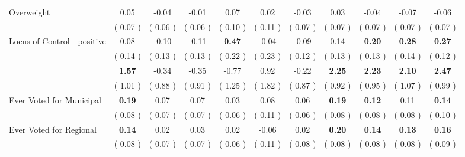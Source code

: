 \begin{tabular}{l c c c c c c c c c c}
Overweight &      0.05 &     -0.04 &     -0.01 &      0.07 &      0.02 &     -0.03 &      0.03 &     -0.04 &     -0.07 &     -0.06 \\
& (     0.07 ) & (     0.06 ) & (     0.06 ) & (     0.10 ) & (     0.11 ) & (     0.07 ) & (     0.07 ) & (     0.07 ) & (     0.07 ) & (     0.07 ) \\
Locus of Control - positive &      0.08 &     -0.10 &     -0.11 & \textbf{      0.47 } &     -0.04 &     -0.09 &      0.14 & \textbf{      0.20 } & \textbf{      0.28 } & \textbf{     0.27} \\
& (     0.14 ) & (     0.13 ) & (     0.13 ) & (     0.22 ) & (     0.23 ) & (     0.12 ) & (     0.13 ) & (     0.13 ) & (     0.14 ) & (     0.12 ) \\
& \textbf{      1.57 } &     -0.34 &     -0.35 &     -0.77 &      0.92 &     -0.22 & \textbf{      2.25 } & \textbf{      2.23 } & \textbf{      2.10 } & \textbf{     2.47} \\
& (     1.01 ) & (     0.88 ) & (     0.91 ) & (     1.25 ) & (     1.82 ) & (     0.87 ) & (     0.92 ) & (     0.95 ) & (     1.07 ) & (     0.99 ) \\
Ever Voted for Municipal & \textbf{      0.19 } &      0.07 &      0.07 &      0.03 &      0.08 &      0.06 & \textbf{      0.19 } & \textbf{      0.12 } &      0.11 & \textbf{     0.14} \\
& (     0.08 ) & (     0.07 ) & (     0.07 ) & (     0.06 ) & (     0.11 ) & (     0.06 ) & (     0.08 ) & (     0.08 ) & (     0.08 ) & (     0.10 ) \\
Ever Voted for Regional & \textbf{      0.14 } &      0.02 &      0.03 &      0.02 &     -0.06 &      0.02 & \textbf{      0.20 } & \textbf{      0.14 } & \textbf{      0.13 } & \textbf{     0.16} \\
& (     0.08 ) & (     0.07 ) & (     0.07 ) & (     0.06 ) & (     0.11 ) & (     0.08 ) & (     0.08 ) & (     0.08 ) & (     0.08 ) & (     0.09 ) \\
\bottomrule
\end{tabular}
